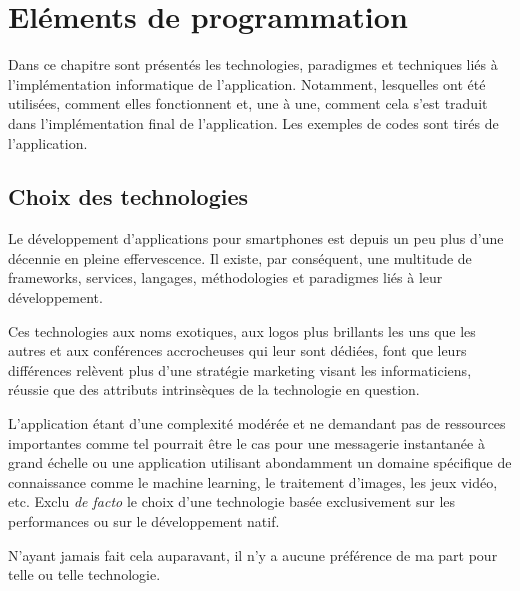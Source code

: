 
\chapter[Eléments de programmation]{Eléments de programmation}
Dans ce chapitre sont présentés les technologies, paradigmes
et techniques liés à l'implémentation informatique de
l'application. Notamment, lesquelles ont été utilisées,
comment elles fonctionnent et, une à une, comment cela
s’est traduit dans l'implémentation final de l'application.
Les exemples de codes sont tirés de l'application.

\section{Choix des technologies}
Le développement d'applications
pour smartphones est depuis un peu plus d'une décennie en pleine effervescence. Il existe, par
conséquent, une multitude de frameworks, services, langages, méthodologies et paradigmes liés à leur
développement.

Ces technologies aux noms exotiques, aux logos plus brillants les uns que les autres et aux
conférences accrocheuses qui leur sont dédiées, font que leurs différences relèvent plus
d'une stratégie marketing visant les informaticiens, réussie que des attributs
intrinsèques de la technologie en question.

L'application étant d'une complexité modérée et ne demandant pas de ressources importantes
comme tel pourrait être le cas pour une messagerie instantanée à grand échelle ou une application
utilisant abondamment un domaine spécifique de connaissance comme le machine learning, le traitement d'images, les jeux vidéo, etc.
Exclu \textit{de facto} le choix d'une technologie basée exclusivement sur les performances ou sur le développement natif.

N'ayant jamais fait cela auparavant, il n'y a aucune préférence de ma part pour telle ou telle technologie.

